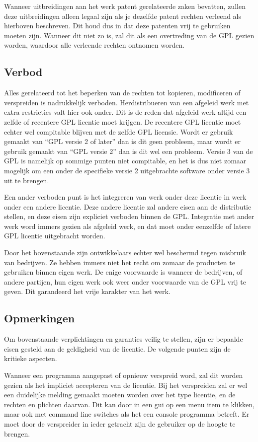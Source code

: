 Wanneer uitbreidingen aan het werk patent gerelateerde zaken bevatten, zullen deze uitbreidingen alleen legaal zijn als je dezelfde patent rechten verleend als hierboven beschreven. Dit houd dus in dat deze patenten vrij te gebruiken moeten zijn. Wanneer dit niet zo is, zal dit als een overtreding van de GPL gezien worden, waardoor alle verleende rechten ontnomen worden. 

\subsection{Verbod}
Alles gerelateerd tot het beperken van de rechten tot kopieren, modificeren of verspreiden is nadrukkelijk verboden. Herdistribueren van een afgeleid werk met extra restricties valt hier ook onder. Dit is de reden dat afgeleid werk altijd een zelfde of recentere GPL licentie moet krijgen. De recentere GPL licentie moet echter wel compitable blijven met de zelfde GPL licensie. Wordt er gebruik gemaakt van ``GPL versie 2 of later'' dan is dit geen probleem, maar wordt er gebruik gemaakt van ``GPL versie 2'' dan is dit wel een probleem. Versie 3 van de GPL is namelijk op sommige punten niet compitable, en het is dus niet zomaar mogelijk om een onder de specifieke versie 2 uitgebrachte software onder versie 3 uit te brengen.

Een ander verboden punt is het integreren van werk onder deze licentie in werk onder een andere licentie. Deze andere licentie zal andere eisen aan de distributie stellen, en deze eisen zijn expliciet verboden binnen de GPL. Integratie met ander werk word immers gezien als afgeleid werk, en dat moet onder eenzelfde of latere GPL licentie uitgebracht worden. 

Door het bovenstaande zijn ontwikkelaars echter wel beschermd tegen misbruik van bedrijven. Ze hebben immers niet het recht om zomaar de producten te gebruiken binnen eigen werk. De enige voorwaarde is wanneer de bedrijven, of andere partijen, hun eigen werk ook weer onder voorwaarde van de GPL vrij te geven. Dit garandeerd het vrije karakter van het werk. 

\subsection{Opmerkingen}
Om bovenstaande verplichtingen en garanties veilig te stellen, zijn er bepaalde eisen gesteld aan de geldigheid van de licentie. De volgende punten zijn de kritieke aspecten. 

Wanneer een programma aangepast of opnieuw verspreid word, zal dit worden gezien als het impliciet accepteren van de licentie. Bij het verspreiden zal er wel een duidelijke melding gemaakt moeten worden over het type licentie, en de rechten en plichten daarvan. Dit kan door in een gui op een menu item te klikken, maar ook met command line switches als het een console programma betreft. Er moet door de verspreider in ieder getracht zijn de gebruiker op de hoogte te brengen. 

